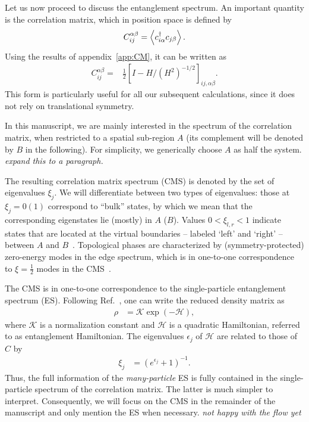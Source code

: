 \documentclass[twocolumn,amsmath,longbibliography,amssymb,superscriptaddress]{revtex4-1}
\newcommand{\mariac}[1]{{\it\color{cyan}#1}}
\begin{document}
Let us now proceed to discuss the entanglement spectrum. 
An important quantity is the correlation matrix, which in position space is defined by
\begin{align}
C_{ij}^{\alpha \beta} = \expval{c_{i\alpha}^\dagger c_{j\beta}}.
\end{align}
Using the results of appendix~\ref{app:CM}, it  can be written  as
\begin{align}\label{eq:corr_mat2}
C_{ij}^{\alpha \beta} =& \frac{1}{2}\left[I - H/ (H^2)^{-1/2} \right]_{ij, \alpha \beta}.
\end{align}
This form is particularly useful for all our subsequent calculations, since it does not rely on translational symmetry. 


In this manuscript, we are mainly interested in the spectrum of the correlation matrix, when restricted to a spatial sub-region $A$ (its complement will be denoted by $B$ in the following). 
For simplicity, we generically choose $A$ as half the system. \mariac{expand this to a paragraph.}
 
The resulting correlation matrix spectrum (CMS) is  denoted by the set of eigenvalues $\xi_j$. 
We will differentiate between two types of eigenvalues: those at $\xi_j=0 (1)$ correspond to ``bulk'' states, by which we mean that the corresponding eigenstates lie (mostly) in  $A$ ($B$). 
Values $0<\xi_{l,r}<1$ indicate states that are located at the virtual boundaries -- labeled `left' and `right' -- between $A$ and $B$~\cite{Peschel2008}. 
Topological phases are characterized by (symmetry-protected) zero-energy modes in the edge spectrum, which is in one-to-one correspondence to $\xi=\frac 1 2$ modes in the CMS~\cite{Fidkowski2010entanglement}.
 

The CMS is in one-to-one correspondence to the single-particle entanglement spectrum (ES). 
Following Ref.~\cite{Peschel2008}, one can write the  reduced density matrix as 
\begin{align}\label{eq:red_dens_mat}
\rho&=\mathcal{K} \exp(-\mathcal H),
\end{align}
where $\mathcal{K}$ is a normalization constant and $\mathcal{H}$ is a quadratic Hamiltonian, referred to as entanglement Hamiltonian. 
The eigenvalues $\epsilon_j$ of $\mathcal{H}$ are related to those of $C$ by 
\begin{align}
\xi_j &=\left(e^{\epsilon_j}+1\right)^{-1}. 
\end{align}
Thus, the full information of the \emph{many-particle} ES is fully contained in the single-particle spectrum of the correlation matrix. 
The latter is much simpler to interpret. 
Consequently, we will focus on the CMS in the remainder of the manuscript and only mention the ES when necessary. 
\mariac{not happy with the flow yet}
\end{document}
